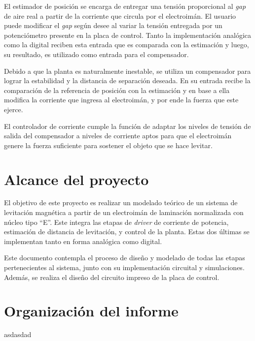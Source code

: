 \noindent El estimador de posición se encarga de entregar una tensión proporcional al \textsl{gap} de aire real a partir de la corriente que circula por el electroimán. El usuario puede modificar el \textsl{gap} según desee al variar la tensión entregada por un potenciómetro presente en la placa de control. Tanto la implementación analógica como la digital reciben esta entrada que es comparada con la estimación y luego, su resultado, es utilizado como entrada para el compensador.

Debido a que la planta es naturalmente inestable, se utiliza un compensador para lograr la estabilidad y la distancia de separación deseada. En su entrada recibe la comparación de la referencia de posición con la estimación y en base a ella modifica la corriente que ingresa al electroimán, y por ende la fuerza que este ejerce.

El controlador de corriente cumple la función de adaptar los niveles de tensión de salida del compensador a niveles de corriente aptos para que el electroimán genere la fuerza suficiente para sostener el objeto que se hace levitar.


\section{Alcance del proyecto}

\noindent El objetivo de este proyecto es realizar un modelado teórico de un sistema de levitación magnética a partir de un electroimán de laminación normalizada con núcleo tipo “E''. Este integra las etapas de \textsl{driver} de corriente de potencia, estimación de distancia de levitación, y control de la planta. Estas dos últimas se implementan tanto en forma analógica como digital.

\noindent Este documento contempla el proceso de diseño y modelado de todas las etapas pertenecientes al sistema, junto con su implementación circuital y simulaciones. Además, se realiza el diseño del circuito impreso de la placa de control.

\section{Organización del informe}

asdasdad
 